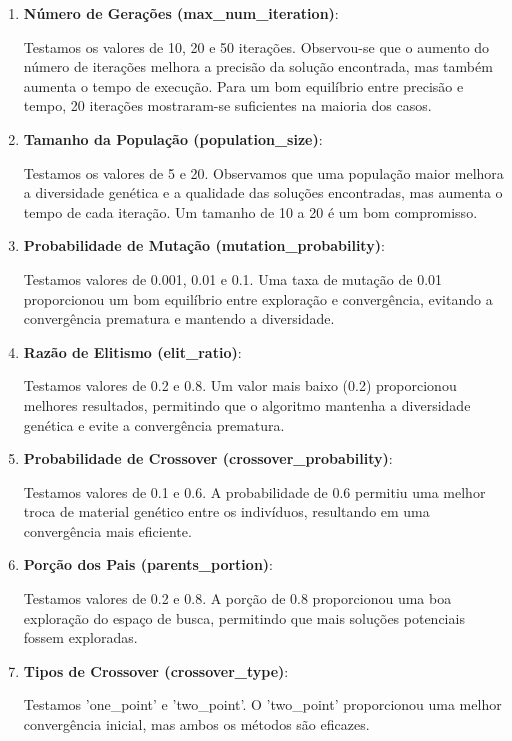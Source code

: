 \documentclass[a4paper, 12pt]{article}
\begin{document}
\begin{enumerate}
    \item \textbf{Número de Gerações (max\_num\_iteration)}:

Testamos os valores de 10, 20 e 50 iterações. Observou-se que o aumento do número de iterações melhora a precisão da solução encontrada, mas também aumenta o tempo de execução. Para um bom equilíbrio entre precisão e tempo, 20 iterações mostraram-se suficientes na maioria dos casos.


    \item \textbf{Tamanho da População (population\_size)}:

Testamos os valores de 5 e 20. Observamos que uma população maior melhora a diversidade genética e a qualidade das soluções encontradas, mas aumenta o tempo de cada iteração. Um tamanho de 10 a 20 é um bom compromisso.

\item \textbf{Probabilidade de Mutação (mutation\_probability)}:

Testamos valores de 0.001, 0.01 e 0.1. Uma taxa de mutação de 0.01 proporcionou um bom equilíbrio entre exploração e convergência, evitando a convergência prematura e mantendo a diversidade.


\item \textbf{Razão de Elitismo (elit\_ratio)}:

Testamos valores de 0.2 e 0.8. Um valor mais baixo (0.2) proporcionou melhores resultados, permitindo que o algoritmo mantenha a diversidade genética e evite a convergência prematura.

\item \textbf{Probabilidade de Crossover (crossover\_probability)}:

Testamos valores de 0.1 e 0.6. A probabilidade de 0.6 permitiu uma melhor troca de material genético entre os indivíduos, resultando em uma convergência mais eficiente.


\item \textbf{Porção dos Pais (parents\_portion)}:

Testamos valores de 0.2 e 0.8. A porção de 0.8 proporcionou uma boa exploração do espaço de busca, permitindo que mais soluções potenciais fossem exploradas.


\item \textbf{Tipos de Crossover (crossover\_type)}:

Testamos 'one\_point' e 'two\_point'. O 'two\_point' proporcionou uma melhor convergência inicial, mas ambos os métodos são eficazes.



\end{enumerate}
\end{document}
